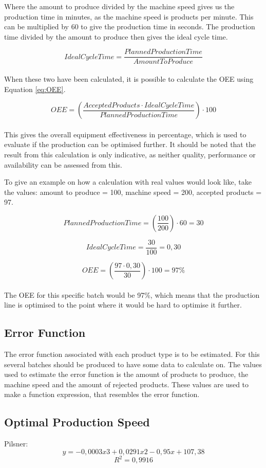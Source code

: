 Where the amount to produce divided by the machine speed gives us the production
time in minutes, as the machine speed is products per minute. This can be
multiplied by 60 to give the production time in seconds. The production time
divided by the amount to produce then gives the ideal cycle time.

\[IdealCycleTime = \frac{PlannedProductionTime}{AmountToProduce}\]\\

When these two have been calculated, it is possible to calculate the OEE using
Equation \ref{eq:OEE}.

\[OEE = \left(\frac{AcceptedProducts\cdot{IdealCycleTime}}{PlannedProductionTime}\right)\cdot100\]\\

This gives the overall equipment effectiveness in percentage, which is used to
evaluate if the production can be optimised further. It should be noted that
the result from this calculation is only indicative, as neither quality,
performance or availability can be assessed from this.

To give an example on how a calculation with real values would look like, take
the values: amount to produce = 100, machine speed = 200, accepted products = 97.

\[PlannedProductionTime = \left(\frac{100}{200}\right)\cdot60 = 30\]

\[IdealCycleTime = \frac{30}{100}=0,30\]

\[OEE = \left(\frac{97\cdot0,30}{30}\right)\cdot100 = 97\%\]\\

The OEE for this specific batch would be 97\%, which means that the production
line is optimised to the point where it would be hard to optimise it further.

\subsection{Error Function}
The error function associated with each product type is to be estimated. For
this several batches should be produced to have some data to calculate on. The
values used to estimate the error function is the amount of products to produce,
the machine speed and the amount of rejected products. These values are used to
make a function expression, that resembles the error function. 


\subsection{Optimal Production Speed}
Pilsner:\\
\[y = -0,0003x3 + 0,0291x2 - 0,95x + 107,38\]
\[R^2 = 0,9916\]


